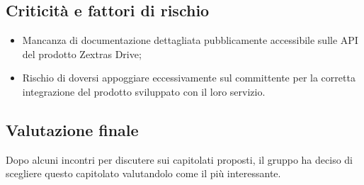 \subsection{Criticità e fattori di rischio}
\begin{itemize}
\item Mancanza di documentazione dettagliata pubblicamente accessibile sulle API del prodotto Zextras Drive;
\item Rischio di doversi appoggiare eccessivamente sul committente per la corretta integrazione del prodotto sviluppato con il loro servizio.
\end{itemize}

\subsection{Valutazione finale}
Dopo alcuni incontri per discutere sui capitolati proposti, il gruppo \textit{\Gruppo{}} ha deciso di scegliere questo capitolato valutandolo come il più interessante.